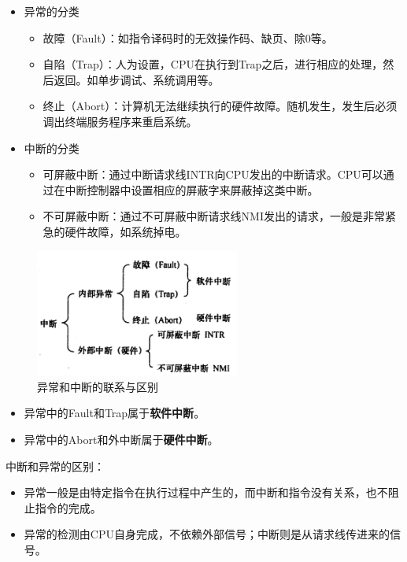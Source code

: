 \documentclass[12pt, a4paper, oneside]{ctexart}
\begin{document}
\begin{itemize}
  \item 异常的分类
  \begin{itemize}
    \item 故障（Fault）：如指令译码时的无效操作码、缺页、除0等。
    \item 自陷（Trap）：人为设置，CPU在执行到Trap之后，进行相应的处理，然后返回。如单步调试、系统调用等。
    \item 终止（Abort）：计算机无法继续执行的硬件故障。随机发生，发生后必须调出终端服务程序来重启系统。
  \end{itemize}
  \item 中断的分类
  \begin{itemize}
    \item 可屏蔽中断：通过中断请求线INTR向CPU发出的中断请求。CPU可以通过在中断控制器中设置相应的屏蔽字来屏蔽掉这类中断。
    \item 不可屏蔽中断：通过不可屏蔽中断请求线NMI发出的请求，一般是非常紧急的硬件故障，如系统掉电。
  \end{itemize}
\end{itemize}

\begin{figure}
  \centering
  \includegraphics[width=0.6\textwidth]{./images/interrupt.png}
  \caption{异常和中断的联系与区别}
\end{figure}

\begin{itemize}
  \item 异常中的Fault和Trap属于\textbf{软件中断}。
  \item 异常中的Abort和外中断属于\textbf{硬件中断}。
\end{itemize}

中断和异常的区别：
\begin{itemize}
  \item 异常一般是由特定指令在执行过程中产生的，而中断和指令没有关系，也不阻止指令的完成。
  \item 异常的检测由CPU自身完成，不依赖外部信号；中断则是从请求线传进来的信号。
\end{itemize}
\end{document}
